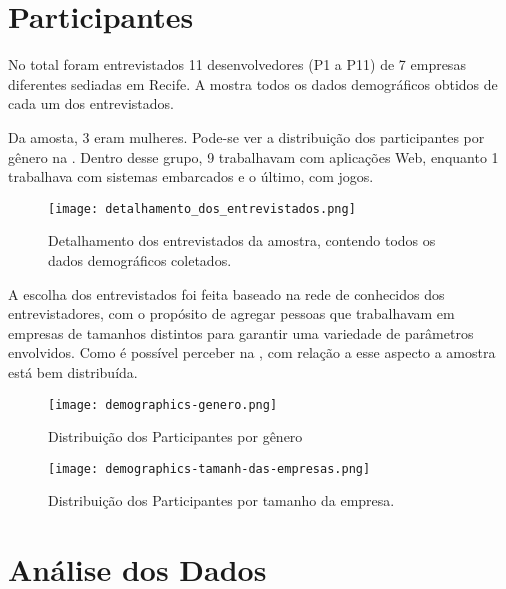 \section{Participantes}

No total foram entrevistados 11 desenvolvedores (P1 a P11) de 7 empresas diferentes sediadas em Recife. A  mostra todos os dados demográficos obtidos de cada um dos entrevistados.


Da amosta, 3 eram mulheres. Pode-se ver a distribuição dos participantes por gênero na . Dentro desse grupo, 9 trabalhavam com aplicações Web, enquanto 1 trabalhava com sistemas embarcados e o último, com jogos.

\begin{figure}[ht]
\begin{center}
\texttt{[image: detalhamento\_dos\_entrevistados.png]}
\end{center}
\caption[Detalhamento dos entrevistados]{
    Detalhamento dos entrevistados da amostra, contendo todos os dados demográficos coletados.
}\label{detalhamento_dos_entrevistados}
\end{figure}


A escolha dos entrevistados foi feita baseado na rede de conhecidos dos entrevistadores, com o propósito de agregar pessoas que trabalhavam em empresas de tamanhos distintos para garantir uma variedade de parâmetros envolvidos. Como é possível perceber na , com relação a esse aspecto a amostra está bem distribuída. 

\begin{figure}
\centering
\begin{minipage}{.48\textwidth}
    \centering
    \texttt{[image: demographics-genero.png]}
    \caption[Distribuição dos Participantes por gênero]{
    Distribuição dos Participantes por gênero
    }\label{genero}
\end{minipage}%
\hfill
\begin{minipage}{.48\textwidth}
    \centering
    \texttt{[image: demographics-tamanh-das-empresas.png]}
    \caption[Distribuição dos Participantes por tamanho da empresa]{
    Distribuição dos Participantes por tamanho da empresa.
    }\label{tamanho_empresa}
\end{minipage}
\end{figure}

\section{Análise dos Dados}

